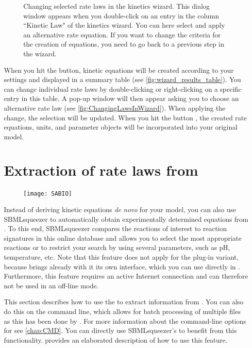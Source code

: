 \begin{figure}
\caption[Changing selected rate laws in the kinetics wizard]{Changing selected rate laws in the kinetics wizard.
This dialog window appears when you double-click on an entry in the column ``Kinetic Law" of the kinetics wizard.
You can here select and apply an alternative rate equation.
If you want to change the criteria for the creation of equations, you need to go back to a previous step in the wizard.}
\label{fig:ChangingLawsInWizard}
\end{figure}

When you hit the  button, kinetic equations will be created according to your settings and displayed in a summary table (see \vref{fig:wizard_results_table}).
You can change individual rate laws by double-clicking or right-clicking on a specific entry in this table.
A pop-up window will then appear asking you to choose an alternative rate law (see \vref{fig:ChangingLawsInWizard}).
When applying the change, the selection will be updated.
When you hit the button , the created rate equations, units, and parameter objects will be incorporated into your original model.

\section{Extraction of rate laws from \SABIO}

\begin{figure}
\vspace{\wrapfigspace}
\texttt{[image: SABIO]}
\end{figure}
Instead of deriving kinetic equations \emph{de novo} for your model, you can also use SBMLsqueezer to automatically obtain experimentally determined equations from \SABIO.
To this end, SBMLsqueezer compares the reactions of interest to reaction signatures in this online database and allows you to select the most appropriate reactions or to restrict your search by using several parameters, such as pH, temperature, etc.
Note that this feature does not apply for the \CellDesigner plug-in variant,
because \CellDesigner brings already with it its own \SABIO interface, which you can use directly in \CellDesigner.
Furthermore, this feature requires an active Internet connection and can therefore not be used in an off-line mode.

This section describes how to use the \GUI to extract information from \SABIO.
You can also do this on the command line, which allows for batch processing of multiple \SBML files as this has been done by \citet{Buechel2013}.
For more information about the command-line options for \SABIO see \vref{chap:CMD}.
You can directly use SBMLsqueezer's \API to benefit from this functionality.  provides an elaborated description of how to use this feature.

